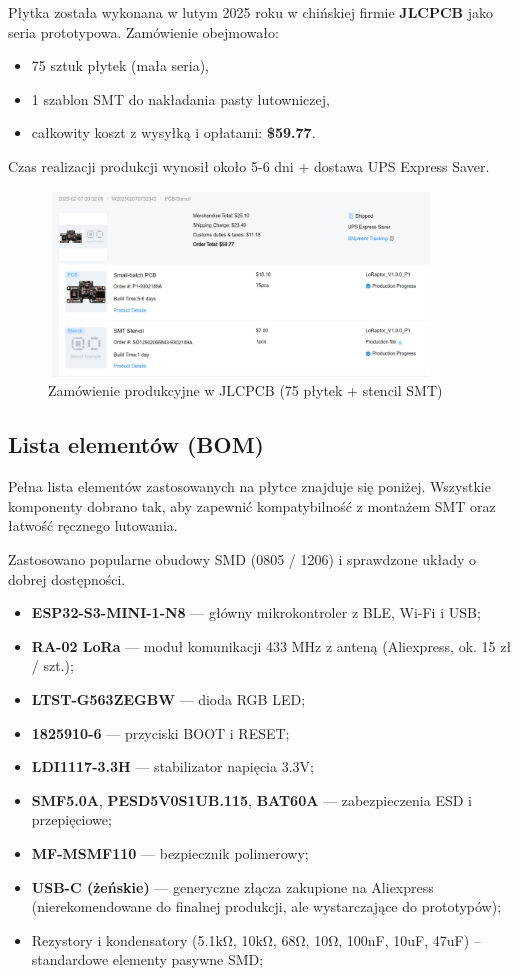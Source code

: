 Płytka została wykonana w lutym 2025 roku w chińskiej firmie \textbf{JLCPCB} jako seria prototypowa. Zamówienie obejmowało:
\begin{itemize}
	\item 75 sztuk płytek (mała seria),
	\item 1 szablon SMT do nakładania pasty lutowniczej,
	\item całkowity koszt z wysyłką i opłatami: \textbf{\$59.77}.
\end{itemize}
Czas realizacji produkcji wynosił około 5-6 dni + dostawa UPS Express Saver.
\begin{figure}[htbp]
\centering
	\includegraphics[width=0.9\textwidth]{root/pcb_order_screenshot.png}
	\caption{Zamówienie produkcyjne w JLCPCB (75 płytek + stencil SMT)}
\end{figure}

\clearpage
\subsection{Lista elementów (BOM)}

Pełna lista elementów zastosowanych na płytce znajduje się poniżej. Wszystkie komponenty dobrano tak, aby zapewnić kompatybilność z montażem SMT oraz łatwość ręcznego lutowania.

Zastosowano popularne obudowy SMD (0805 / 1206) i sprawdzone układy o dobrej dostępności.

\begin{itemize}
	\item \textbf{ESP32-S3-MINI-1-N8} — główny mikrokontroler z BLE, Wi-Fi i USB;
	\item \textbf{RA-02 LoRa} — moduł komunikacji 433 MHz z anteną (Aliexpress, ok. 15 zł / szt.);
	\item \textbf{LTST-G563ZEGBW} — dioda RGB LED;
	\item \textbf{1825910-6} — przyciski BOOT i RESET;
	\item \textbf{LDI1117-3.3H} — stabilizator napięcia 3.3V;
	\item \textbf{SMF5.0A}, \textbf{PESD5V0S1UB.115}, \textbf{BAT60A} — zabezpieczenia ESD i przepięciowe;
	\item \textbf{MF-MSMF110} — bezpiecznik polimerowy;
	\item \textbf{USB-C (żeńskie)} — generyczne złącza zakupione na Aliexpress (nierekomendowane do finalnej produkcji, ale wystarczające do prototypów);
	\item Rezystory i kondensatory (5.1kΩ, 10kΩ, 68Ω, 10Ω, 100nF, 10uF, 47uF) – standardowe elementy pasywne SMD;
\end{itemize}